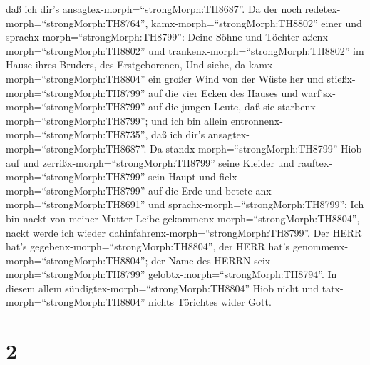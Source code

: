 daß ich dir's ansagtex-morph=``strongMorph:TH8687''.  Da
der noch redetex-morph=``strongMorph:TH8764'',
kamx-morph=``strongMorph:TH8802'' einer und
sprachx-morph=``strongMorph:TH8799'': Deine Söhne und Töchter
aßenx-morph=``strongMorph:TH8802'' und
trankenx-morph=``strongMorph:TH8802'' im Hause ihres Bruders, des
Erstgeborenen,  Und siehe, da
kamx-morph=``strongMorph:TH8804'' ein großer Wind von der Wüste her und
stießx-morph=``strongMorph:TH8799'' auf die vier Ecken des Hauses und
warf'sx-morph=``strongMorph:TH8799'' auf die jungen Leute, daß sie
starbenx-morph=``strongMorph:TH8799''; und ich bin allein
entronnenx-morph=``strongMorph:TH8735'', daß ich dir's
ansagtex-morph=``strongMorph:TH8687''.  Da
standx-morph=``strongMorph:TH8799'' Hiob auf und
zerrißx-morph=``strongMorph:TH8799'' seine Kleider und
rauftex-morph=``strongMorph:TH8799'' sein Haupt und
fielx-morph=``strongMorph:TH8799'' auf die Erde und betete
anx-morph=``strongMorph:TH8691''  und
sprachx-morph=``strongMorph:TH8799'': Ich bin nackt von meiner Mutter
Leibe gekommenx-morph=``strongMorph:TH8804'', nackt werde ich wieder
dahinfahrenx-morph=``strongMorph:TH8799''. Der HERR hat's
gegebenx-morph=``strongMorph:TH8804'', der HERR hat's
genommenx-morph=``strongMorph:TH8804''; der Name des HERRN
seix-morph=``strongMorph:TH8799'' gelobtx-morph=``strongMorph:TH8794''.
 In diesem allem sündigtex-morph=``strongMorph:TH8804''
Hiob nicht und tatx-morph=``strongMorph:TH8804'' nichts Törichtes wider
Gott.

\hypertarget{section-1}{%
\section{2}\label{section-1}}

